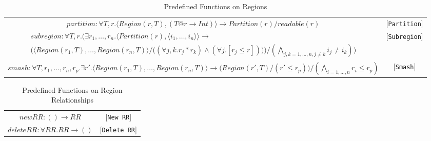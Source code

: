 \documentclass{article}
\begin{document}
\begin{table*}
\centering
{\small
\begin{tabular}{cc}

%
%
\begin{math}
partition : \forall T,r. \langle Region(r,T), (T@r \rightarrow Int) \rangle \rightarrow Partition(r) / readable(r)
\end{math} & [{\tt Partition}] \\

%
%
\begin{math}
\begin{array}{lc}
subregion : \forall T,r. \bigg( \exists r_1, \ldots, r_n . \langle Partition(r), \langle i_1, \ldots, i_n \rangle \rangle \rightarrow \\
	\Big( \langle Region(r_1,T), \ldots, Region(r_n,T) \rangle / \big((\forall j,k. r_j * r_k) \wedge (\forall j. [r_j \le r])\big)\Big) / (\bigwedge_{j,k = 1, \ldots, n, j \ne k} i_j \ne i_k) \bigg)
\end{array}
\end{math} & [{\tt Subregion}] \\

%
%
\begin{math}
smash : \forall T,r_1,\ldots,r_n,r_p. \exists r'. \langle Region(r_1,T), \ldots, Region(r_n,T) \rangle \rightarrow \big(Region(r\prime,T) / (r\prime \le r_p)\big) / (\bigwedge_{i = 1, \ldots, n} r_i \le r_p)
\end{math} & [{\tt Smash}] \\

\end{tabular}
}
\caption{Predefined Functions on Regions}
\end{table*}

\begin{table*}
\centering
{\small
\begin{tabular}{cc}

%
%
\begin{math}
newRR : () \rightarrow RR
\end{math} & [{\tt New RR}] \\

%
%
\begin{math}
deleteRR : \forall RR.RR \rightarrow ()
\end{math} & [{\tt Delete RR}] \\
\end{tabular}
}
\caption{Predefined Functions on Region Relationships}
\end{table*}
\end{document}
